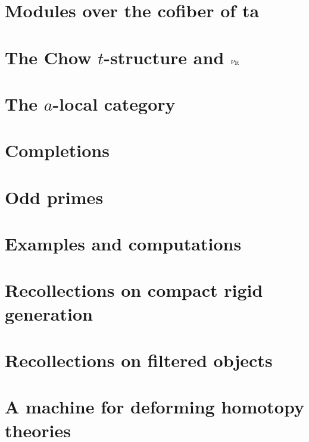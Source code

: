 \documentclass[reqno]{amsart}
\begin{document}
\section{Modules over the cofiber of ta} \label{sec:cta}


\section{The Chow $t$-structure and $\nu_{\mathbb{R}}$} \label{sec:t-structures}


\section{The $a$-local category} \label{sec:a-local}


\section{Completions} \label{sec:completion}


\section{Odd primes} \label{sec:odd}


\section{Examples and computations} \label{sec:computations}


\appendix

\section{Recollections on compact rigid generation} \label{app:boilerplate}


\section{Recollections on filtered objects} \label{app:fil}


\section{A machine for deforming homotopy theories} \label{app:def}






\end{document}
